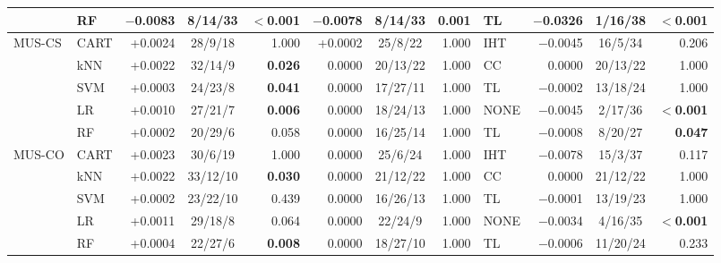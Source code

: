 \begin{table}[!htbp]
\begin{adjustbox}{max width=\linewidth}
\begin{tabular}{llrcrrcrlrcr}
 & RF & $-$0.0083 & 8/14/33 & \textbf{$<$0.001} & $-$0.0078 & 8/14/33 & \textbf{0.001} & TL & $-$0.0326 & 1/16/38 & \textbf{$<$0.001} \\
\midrule
MUS-CS & CART & +0.0024 & 28/9/18 & 1.000 & +0.0002 & 25/8/22 & 1.000 & IHT & $-$0.0045 & 16/5/34 & 0.206 \\
 & kNN & +0.0022 & 32/14/9 & \textbf{0.026} & 0.0000 & 20/13/22 & 1.000 & CC & 0.0000 & 20/13/22 & 1.000 \\
 & SVM & +0.0003 & 24/23/8 & \textbf{0.041} & 0.0000 & 17/27/11 & 1.000 & TL & $-$0.0002 & 13/18/24 & 1.000 \\
 & LR & +0.0010 & 27/21/7 & \textbf{0.006} & 0.0000 & 18/24/13 & 1.000 & NONE & $-$0.0045 & 2/17/36 & \textbf{$<$0.001} \\
 & RF & +0.0002 & 20/29/6 & 0.058 & 0.0000 & 16/25/14 & 1.000 & TL & $-$0.0008 & 8/20/27 & \textbf{0.047} \\
\midrule
MUS-CO & CART & +0.0023 & 30/6/19 & 1.000 & 0.0000 & 25/6/24 & 1.000 & IHT & $-$0.0078 & 15/3/37 & 0.117 \\
 & kNN & +0.0022 & 33/12/10 & \textbf{0.030} & 0.0000 & 21/12/22 & 1.000 & CC & 0.0000 & 21/12/22 & 1.000 \\
 & SVM & +0.0002 & 23/22/10 & 0.439 & 0.0000 & 16/26/13 & 1.000 & TL & $-$0.0001 & 13/19/23 & 1.000 \\
 & LR & +0.0011 & 29/18/8 & 0.064 & 0.0000 & 22/24/9 & 1.000 & NONE & $-$0.0034 & 4/16/35 & \textbf{$<$0.001} \\
 & RF & +0.0004 & 22/27/6 & \textbf{0.008} & 0.0000 & 18/27/10 & 1.000 & TL & $-$0.0006 & 11/20/24 & 0.233 \\
\bottomrule
\end{tabular}
\end{adjustbox}
\end{table}
